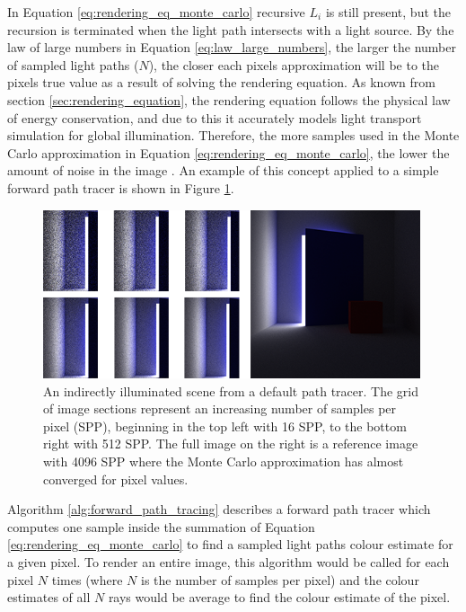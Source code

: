 \documentclass[../dissertation.tex]{subfiles}
\begin{document}
In Equation \ref{eq:rendering_eq_monte_carlo} recursive $L_i$ is still present, but the recursion is terminated when the light path intersects with a light source. By the law of large numbers in Equation \ref{eq:law_large_numbers}, the larger the number of sampled light paths ($N$), the closer each pixels approximation will be to the pixels true value as a result of solving the rendering equation. As known from section \ref{sec:rendering_equation}, the rendering equation follows the physical law of energy conservation, and due to this it accurately models light transport simulation for global illumination. Therefore, the more samples used in the Monte Carlo approximation in Equation \ref{eq:rendering_eq_monte_carlo}, the lower the amount of noise in the image \cite{christensen2016path}. An example of this concept applied to a simple forward path tracer is shown in Figure \ref{fig:reduce_noise_spp_example}.

\begin{figure}[h]
\begin{center}
\includegraphics[width=0.99\textwidth]{images/renders/noise_reduction_default/increasing_samples.png}    
\end{center}
\caption{An indirectly illuminated scene from a default path tracer. The grid of image sections represent an increasing number of samples per pixel (SPP), beginning in the top left with 16 SPP, to the bottom right with 512 SPP. The full image on the right is a reference image with 4096 SPP where the Monte Carlo approximation has almost converged for pixel values.}
\label{fig:reduce_noise_spp_example}
\end{figure}

Algorithm \ref{alg:forward_path_tracing} describes a forward path tracer which computes one sample inside the summation of Equation \ref{eq:rendering_eq_monte_carlo} to find a sampled light paths colour estimate for a given pixel. To render an entire image, this algorithm would be called for each pixel $N$ times (where $N$ is the number of samples per pixel) and the colour estimates of all $N$ rays would be average to find the colour estimate of the pixel.\\
\end{document}
